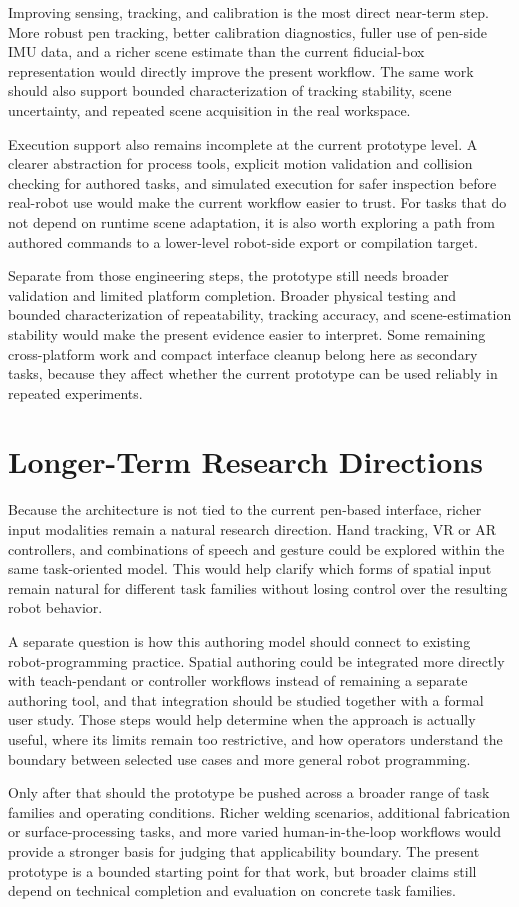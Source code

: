 Improving sensing, tracking, and calibration is the most direct near-term step. More robust pen tracking, better calibration diagnostics, fuller use of pen-side IMU data, and a richer scene estimate than the current fiducial-box representation would directly improve the present workflow. The same work should also support bounded characterization of tracking stability, scene uncertainty, and repeated scene acquisition in the real workspace.

Execution support also remains incomplete at the current prototype level. A clearer abstraction for process tools, explicit motion validation and collision checking for authored tasks, and simulated execution for safer inspection before real-robot use would make the current workflow easier to trust. For tasks that do not depend on runtime scene adaptation, it is also worth exploring a path from authored commands to a lower-level robot-side export or compilation target.

Separate from those engineering steps, the prototype still needs broader validation and limited platform completion. Broader physical testing and bounded characterization of repeatability, tracking accuracy, and scene-estimation stability would make the present evidence easier to interpret. Some remaining cross-platform work and compact interface cleanup belong here as secondary tasks, because they affect whether the current prototype can be used reliably in repeated experiments.

\section{Longer-Term Research Directions}

Because the architecture is not tied to the current pen-based interface, richer input modalities remain a natural research direction. Hand tracking, VR or AR controllers, and combinations of speech and gesture could be explored within the same task-oriented model. This would help clarify which forms of spatial input remain natural for different task families without losing control over the resulting robot behavior.

A separate question is how this authoring model should connect to existing robot-programming practice. Spatial authoring could be integrated more directly with teach-pendant or controller workflows instead of remaining a separate authoring tool, and that integration should be studied together with a formal user study. Those steps would help determine when the approach is actually useful, where its limits remain too restrictive, and how operators understand the boundary between selected use cases and more general robot programming.

Only after that should the prototype be pushed across a broader range of task families and operating conditions. Richer welding scenarios, additional fabrication or surface-processing tasks, and more varied human-in-the-loop workflows would provide a stronger basis for judging that applicability boundary. The present prototype is a bounded starting point for that work, but broader claims still depend on technical completion and evaluation on concrete task families.
